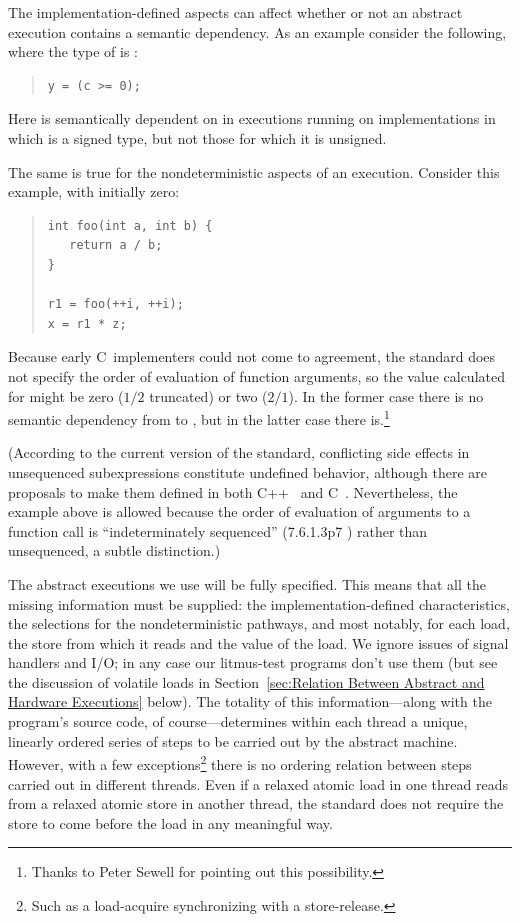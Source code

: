 \documentclass[10]{article}
\begin{document}
The implementation-defined aspects can affect whether or not an
abstract execution contains a semantic dependency.
As an example consider the following, where the type of  is :
\begin{quote}
\begin{verbatim}
y = (c >= 0);
\end{verbatim}
\end{quote}
Here  is semantically dependent on  in executions
running on implementations in
which  is a signed type,
but not those for which it is unsigned.

The same is true for the nondeterministic aspects of an execution.
Consider this example, with  initially zero:
\begin{quote}
\begin{verbatim}
int foo(int a, int b) {
   return a / b;
}

r1 = foo(++i, ++i);
x = r1 * z;
\end{verbatim}
\end{quote}
Because early C~implementers could not come to agreement, the standard
does not specify the order of evaluation of function arguments, so
the value calculated for  might be zero ($1/2$ truncated) or two
($2/1$).
In the former case there is no semantic dependency from  to ,
but in the latter case there is.\footnote{
	Thanks to Peter Sewell for pointing out this possibility.}

(According to the current version of the standard, conflicting side effects
in unsequenced subexpressions constitute undefined behavior,
although there are proposals to make them defined in both
C++~\cite{GabrielDosReis2016P0145r3}
and C~\cite{AlexCeleste2023N3203}.
Nevertheless, the example above is allowed because the order of evaluation
of arguments to a function call is ``indeterminately sequenced''
(7.6.1.3p7 ) rather than unsequenced, a subtle distinction.)

\medskip

The abstract executions we use will be fully specified.
This means that all the missing information must be supplied:
the implementation-defined characteristics, the selections for the
nondeterministic pathways, and most notably, for each load, the store
from which it reads and the value of the load.
We ignore issues of signal handlers and I/O;
in any case our litmus-test programs don't use them
(but see the discussion of volatile loads in
Section~\ref{sec:Relation Between Abstract and Hardware Executions} below).
The totality of this information---along with the program's source
code, of course---determines within each thread a unique, linearly
ordered series of steps to be carried out by the abstract machine.
However, with a few exceptions\footnote{
	Such as a load-acquire synchronizing with a store-release.}
there is no ordering relation between steps carried out
in different threads.
Even if a relaxed atomic load in one thread reads from a relaxed
atomic store in another thread, the standard does not require the
store to come before the load in any meaningful way.
\end{document}
